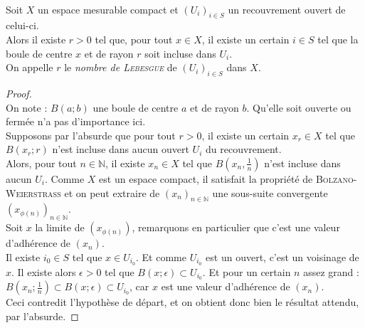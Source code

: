 		\begin{lemm}~\\
			Soit $X$ un espace mesurable compact et $(U_{i})_{i\in S}$ un recouvrement ouvert de celui-ci.\\
			Alors il existe $r>0$ tel que, pour tout $x\in X$, il existe un certain $i\in S$ tel que la boule de centre $x$
			et de rayon $r$ soit incluse dans $U_{i}$.\\
			On appelle $r$ le \emph{nombre de \textsc{Lebesgue}} de $(U_{i})_{i\in S}$ dans $X$.
		\end{lemm}
		\begin{proof}~\\
			On note : $B(a; b)$ une boule de centre $a$ et de rayon $b$. Qu'elle soit ouverte ou fermée n'a pas d'importance ici.\\
			Supposons par l'absurde que pour tout $r>0$, il existe un certain $x_{r}\in X$ tel que $B(x_{r}; r)$ 
			n'est incluse dans aucun ouvert $U_{i}$ du recouvrement.\\
			Alors, pour tout $n\in\mathbb{N}$, il existe $x_{n}\in X$ tel que $B(x_{n}, \frac{1}{n})$ n'est incluse dans aucun $U_{i}$. 
			Comme $X$ est un espace compact, il satisfait la propriété de \textsc{Bolzano-Weierstrass} et on peut extraire de 
			$(x_{n})_{n\in\mathbb{N}}$ une sous-suite convergente $(x_{\phi(n)})_{n\in\mathbb{N}}$.\\
			Soit $x$ la limite de $(x_{\phi(n)})$, remarquons en particulier que c'est une valeur d'adhérence de $(x_{n})$.\\
			Il existe $i_{0}\in S$ tel que $x\in U_{i_{0}}$. Et comme $U_{i_{0}}$ est un ouvert, c'est un voisinage de $x$. Il existe 
			alors $\epsilon>0$ tel que $B(x;\epsilon)\subset U_{i_{0}}$. Et pour un certain $n$ assez grand : 
			$B(x_{n}; \frac{1}{n})\subset B(x;\epsilon)\subset U_{i_{0}}$, car $x$ est une valeur d'adhérence de $(x_{n})$.\\
			Ceci contredit l'hypothèse de départ, et on obtient donc bien le résultat attendu, par l'absurde.
		\end{proof}
		
